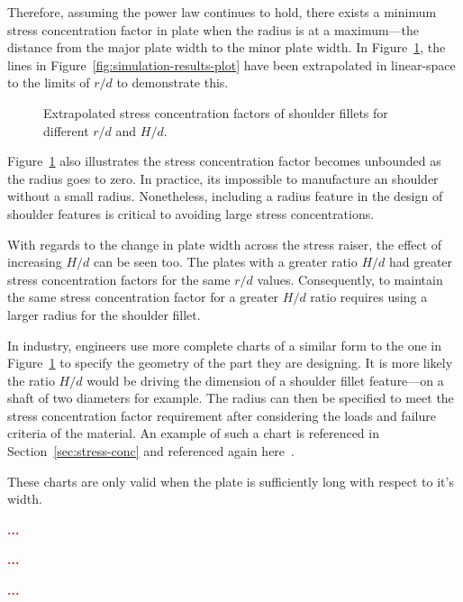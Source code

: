 \documentclass[a4paper,11pt,twocolumn]{article}
\begin{document}
Therefore, assuming the power law continues to hold, there exists a minimum
stress concentration factor in plate when the radius is at a maximum---the
distance from the major plate width to the minor plate width. In 
Figure~\ref{fig:simulation-extrapolated}, the lines in
Figure~\vref{fig:simulation-results-plot} have been extrapolated in linear-space
to the limits of $r/d$ to demonstrate this.

\begin{figure}[h]
    \small
    \centering
    \def\svgwidth{\linewidth}
    
    \caption{Extrapolated stress concentration factors of shoulder fillets for
        different $r/d$ and $H/d$.}
    \label{fig:simulation-extrapolated}
\end{figure}

Figure~\ref{fig:simulation-extrapolated} also illustrates the stress 
concentration factor becomes unbounded as the radius goes to zero. In practice,
its impossible to manufacture an shoulder without a small radius. Nonetheless,
including a radius feature in the design of shoulder features is critical to
avoiding large stress concentrations.

With regards to the change in plate width across the stress raiser, the effect
of increasing $H/d$ can be seen too. The plates with a greater ratio $H/d$ had
greater stress concentration factors for the same $r/d$ values. Consequently,
to maintain the same stress concentration factor for a greater $H/d$
ratio requires using a larger radius for the shoulder fillet.

In industry, engineers use more complete charts of a similar form to the one in
Figure~\ref{fig:simulation-extrapolated} to specify the geometry of the part
they are designing. It is more likely the ratio $H/d$ would be driving the
dimension of a shoulder fillet feature---on a shaft of two diameters for
example. The radius can then be specified to meet the stress concentration
factor requirement after considering the loads and failure criteria of the
material. An example of such a chart is referenced in
Section~\ref{sec:stress-conc} and referenced again 
\mbox{here~\cite[p.~151]{pilkey2008peterson}}.

These charts are only valid when the plate is sufficiently long with respect to
it's width.

\textcolor{red}{\bf\LARGE...}

\textcolor{red}{\bf\LARGE...}

\textcolor{red}{\bf\LARGE...}
\end{document}
